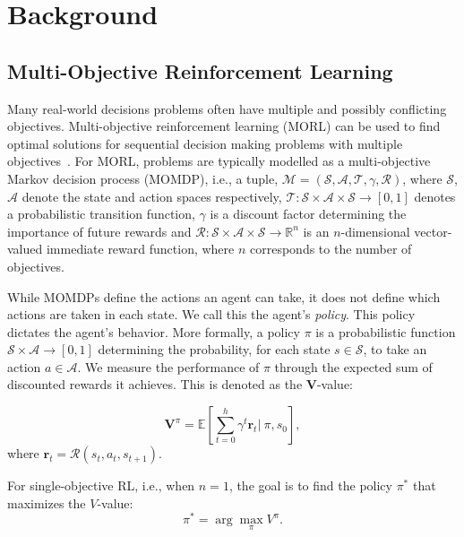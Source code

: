 \documentclass{article}
\renewcommand{\cite}[1]{\citep{#1}}
\newcommand{\mdpstatespace}{\mathcal{S}}
\newcommand{\mdpactionspace}{\mathcal{A}}
\newcommand{\mdpdiscount}{\gamma}
\newcommand{\mdppolicy}{\pi}
\newcommand{\mdpvaluefunction}{V}
\newcommand{\momdpvaluefunction}{\mathbf{V}}
\newcommand{\mdptransition}{\mathcal{T}}
\newcommand{\mdprewardfn}{\mathcal{R}}
\newcommand{\momdprewardfn}{\bm{\mathcal{R}}}
\newcommand{\state}{s}
\newcommand{\momdpreward}{\mathbf{r}}
\newcommand{\action}{a}
\begin{document}
\section{Background}
\subsection{Multi-Objective Reinforcement Learning}
Many real-world decisions problems often have multiple and possibly conflicting objectives. Multi-objective reinforcement learning (MORL) can be used to find optimal solutions for sequential decision making problems with multiple objectives~\cite{hayes2021practical}. For MORL, problems are typically modelled as a multi-objective Markov decision process (MOMDP), i.e., a tuple, $\mathcal{M} = (\mdpstatespace, \mdpactionspace, \mdptransition, \mdpdiscount, \momdprewardfn)$, where $\mdpstatespace$, $\mdpactionspace$ denote the state and action spaces respectively, $\mdptransition \colon \mdpstatespace \times \mdpactionspace \times \mdpstatespace  \to \left[ 0, 1 \right]$ denotes a probabilistic transition function, $\mdpdiscount$ is a discount factor determining the importance of future rewards and $\momdprewardfn \colon \mdpstatespace \times \mdpactionspace \times \mdpstatespace \to \mathbb{R}^n$ is an $n$-dimensional vector-valued immediate reward function, where $n$ corresponds to the number of objectives. 

While MOMDPs define the actions an agent can take, it does not define which actions are taken in each state. We call this the agent's \emph{policy}. This policy dictates the agent's behavior. More formally, a policy $\mdppolicy$ is a probabilistic function $\mdpstatespace \times \mdpactionspace \to \left[ 0, 1 \right]$ determining the probability, for each state $s \in \mdpstatespace$, to take an action $a \in \mdpactionspace$. We measure the performance of $\mdppolicy$ through the expected sum of discounted rewards it achieves. This is denoted as the $\momdpvaluefunction$-value:

\begin{equation}
    \momdpvaluefunction^\mdppolicy = \mathbb{E} \left [ \sum_{t=0}^h \mdpdiscount^t \momdpreward_t |\ \mdppolicy, s_0 \right ],
\end{equation}
%
where $\momdpreward_t = \mdprewardfn(\state_t, \action_t, \state_{t+1})$.

For single-objective RL, i.e., when $n = 1$, the goal is to find the policy $\mdppolicy^{*}$ that maximizes the $\mdpvaluefunction$-value:
\begin{equation}
\mdppolicy^*= \arg\max_\mdppolicy \mdpvaluefunction^\mdppolicy.
\end{equation}
\end{document}
